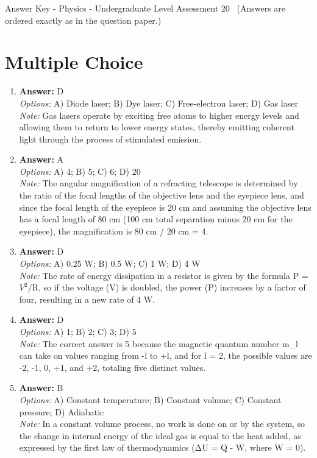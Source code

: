 \documentclass[12pt]{article}
\begin{document}
\begin{center}
Answer Key - Physics - Undergraduate Level Assessment 20 \
\small (Answers are ordered exactly as in the question paper.)
\end{center}

\section*{Multiple Choice}
\begin{enumerate}[label=\arabic*.]
\item \textbf{Answer:} D
\\ \textit{Options:} A) Diode laser; B) Dye laser; C) Free-electron laser; D) Gas laser
\\ \textit{Note:} Gas lasers operate by exciting free atoms to higher energy levels and allowing them to return to lower energy states, thereby emitting coherent light through the process of stimulated emission.
\item \textbf{Answer:} A
\\ \textit{Options:} A) 4; B) 5; C) 6; D) 20
\\ \textit{Note:} The angular magnification of a refracting telescope is determined by the ratio of the focal lengths of the objective lens and the eyepiece lens, and since the focal length of the eyepiece is 20 cm and assuming the objective lens has a focal length of 80 cm (100 cm total separation minus 20 cm for the eyepiece), the magnification is 80 cm / 20 cm = 4.
\item \textbf{Answer:} D
\\ \textit{Options:} A) 0.25 W; B) 0.5 W; C) 1 W; D) 4 W
\\ \textit{Note:} The rate of energy dissipation in a resistor is given by the formula P = $V^2$/R, so if the voltage (V) is doubled, the power (P) increases by a factor of four, resulting in a new rate of 4 W.
\item \textbf{Answer:} D
\\ \textit{Options:} A) 1; B) 2; C) 3; D) 5
\\ \textit{Note:} The correct answer is 5 because the magnetic quantum number m\_l can take on values ranging from -l to +l, and for l = 2, the possible values are -2, -1, 0, +1, and +2, totaling five distinct values.
\item \textbf{Answer:} B
\\ \textit{Options:} A) Constant temperature; B) Constant volume; C) Constant pressure; D) Adiabatic
\\ \textit{Note:} In a constant volume process, no work is done on or by the system, so the change in internal energy of the ideal gas is equal to the heat added, as expressed by the first law of thermodynamics (ΔU = Q - W, where W = 0).
\end{enumerate}
\end{document}
